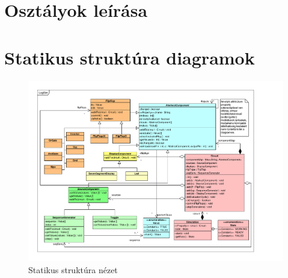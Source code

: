\section{Osztályok leírása}




%

\section{Statikus struktúra diagramok}

\begin{figure}[H]
\begin{center}
\includegraphics*[angle=90, width=17cm, viewport = 30 30 745 565]{chapters/chapter04/classdiagram/class.pdf}
\caption{Statikus struktúra nézet}
\label{fig:class_diagram}
\end{center}
\end{figure}
%
%
%

